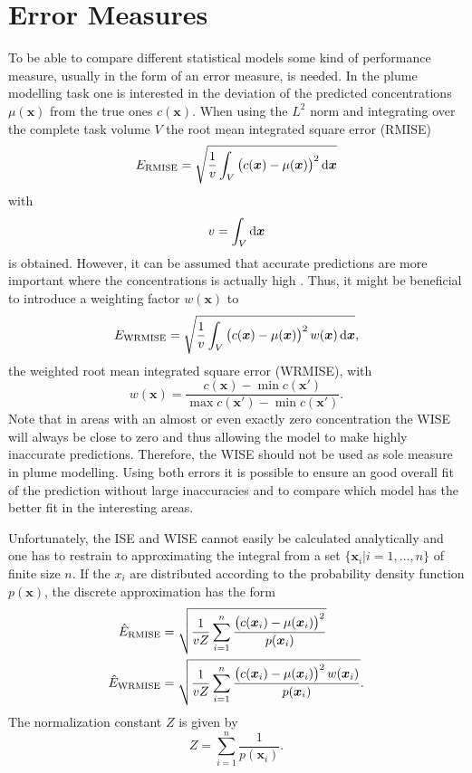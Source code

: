 \documentclass[11pt,a4paper,twoside,BCOR=15mm]{scrreprt}
\newcommand{\vc}[1]{\bm{#1}}
\newcommand{\ped}[1]{_{\mathrm{#1}}}
\begin{document}
\chapter{Error Measures}
To be able to compare different statistical models some kind of performance 
measure, usually in the form of an error measure, is needed. In the plume 
modelling task one is interested in the deviation of the predicted 
concentrations $\mu(\vc x)$ from the true ones $c(\vc x)$. When using the $L^2$ 
norm and integrating over the complete task volume $V$ the root mean integrated 
square error (RMISE)
\begin{equation}
    E\ped{RMISE} = \sqrt{\frac{1}{v} \int_V \del{c(\vc x) - \mu(\vc x)}^2 
        \dif\vc x}
\end{equation}
with
\begin{equation}
    v = \int_V \dif\vc x
\end{equation}
is obtained. However, it can be assumed that accurate predictions are more 
important where the concentrations is actually high 
\parencite[c.p.][]{Marchant:2012wb}. Thus, it might be beneficial to introduce 
a weighting factor $w(\vc x)$ to
\begin{equation}
    E\ped{WRMISE} = \sqrt{\frac{1}{v} \int_V \del{c(\vc x) - \mu(\vc x)}^2 w(\vc 
        x) \dif\vc x} \text{,}
\end{equation}
the weighted root mean integrated square error (WRMISE), with
\begin{equation}
    w(\vc x) = \frac{c(\vc x) - \min c(\vc x')}{\max c(\vc x') - \min c(\vc x')} 
    \text{.}
\end{equation}
Note that in areas with an almost or even exactly zero concentration the WISE 
will always be close to zero and thus allowing the model to make highly 
inaccurate predictions. Therefore, the WISE should not be used as sole measure 
in plume modelling. Using both errors it is possible to ensure an good overall 
fit of the prediction without large inaccuracies and to compare which model has 
the better fit in the interesting areas.

Unfortunately, the ISE and WISE cannot easily be calculated analytically and one 
has to restrain to approximating the integral from a set $\{\vc x_i | i = 1, 
\dots, n\}$ of finite size $n$. If the $x_i$ are distributed according to the 
probability density function $p(\vc x)$, the discrete approximation has the form
\begin{align}
    \hat E\ped{RMISE} &= \sqrt{\frac{1}{vZ} \sum_{i=1}^n \frac{\del{c(\vc x_i) 
                - \mu(\vc x_i)}^2}{p(\vc x_i)}} \\
    \hat E\ped{WRMISE} &= \sqrt{\frac{1}{vZ} \sum_{i=1}^n \frac{\del{c(\vc x_i) 
                - \mu(\vc x_i)}^2 w(\vc x_i)}{p(\vc x_i)}} \text{.}
\end{align}
The normalization constant $Z$ is given by
\begin{equation}
    Z = \sum_{i=1}^n \frac{1}{p(\vc x_i)} \text{.}
\end{equation}
\end{document}
